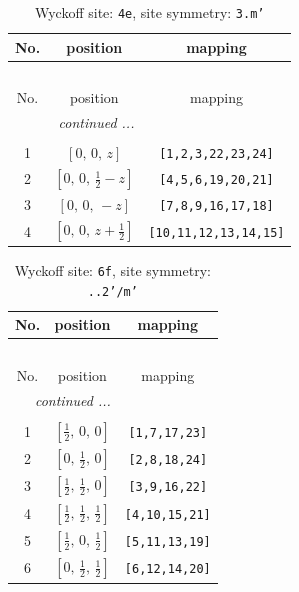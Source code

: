 \documentclass[fleqn,8pt]{jsarticle}
\begin{document}
\renewcommand{\arraystretch}{1.2}
\begin{longtable}{ccc}
\caption{Wyckoff site: {\tt 4e}, site symmetry: {\tt 3.m'}}
 \\
 \hline \hline
No. & position & mapping \\ \hline \endfirsthead

\multicolumn{2}{l}{\tablename\ \thetable{}} \\
 \hline \hline
No. & position & mapping \\ \hline \endhead

 \hline \hline
\multicolumn{2}{r}{\footnotesize\it continued ...} \\ \endfoot

 \hline \hline
\multicolumn{2}{r}{} \\ \endlastfoot

1 & $\left[ 0,\, 0,\, z \right]$ & {\tt [1,2,3,22,23,24]} \\ \hline
2 & $\left[ 0,\, 0,\, \frac{1}{2} - z \right]$ & {\tt [4,5,6,19,20,21]} \\ \hline
3 & $\left[ 0,\, 0,\, - z \right]$ & {\tt [7,8,9,16,17,18]} \\ \hline
4 & $\left[ 0,\, 0,\, z + \frac{1}{2} \right]$ & {\tt [10,11,12,13,14,15]} \\
\end{longtable}
\renewcommand{\arraystretch}{1.2}
\begin{longtable}{ccc}
\caption{Wyckoff site: {\tt 6f}, site symmetry: {\tt ..2'/m'}}
 \\
 \hline \hline
No. & position & mapping \\ \hline \endfirsthead

\multicolumn{2}{l}{\tablename\ \thetable{}} \\
 \hline \hline
No. & position & mapping \\ \hline \endhead

 \hline \hline
\multicolumn{2}{r}{\footnotesize\it continued ...} \\ \endfoot

 \hline \hline
\multicolumn{2}{r}{} \\ \endlastfoot

1 & $\left[ \frac{1}{2},\, 0,\, 0 \right]$ & {\tt [1,7,17,23]} \\ \hline
2 & $\left[ 0,\, \frac{1}{2},\, 0 \right]$ & {\tt [2,8,18,24]} \\ \hline
3 & $\left[ \frac{1}{2},\, \frac{1}{2},\, 0 \right]$ & {\tt [3,9,16,22]} \\ \hline
4 & $\left[ \frac{1}{2},\, \frac{1}{2},\, \frac{1}{2} \right]$ & {\tt [4,10,15,21]} \\ \hline
5 & $\left[ \frac{1}{2},\, 0,\, \frac{1}{2} \right]$ & {\tt [5,11,13,19]} \\ \hline
6 & $\left[ 0,\, \frac{1}{2},\, \frac{1}{2} \right]$ & {\tt [6,12,14,20]} \\
\end{longtable}
\end{document}
